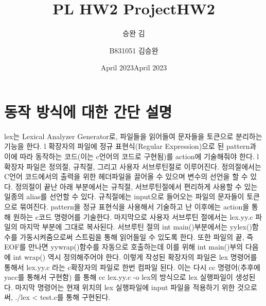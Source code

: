 \documentclass{article}
\title{PL HW2 Project}
\author{승완 김}
\date{April 2023}
\begin{document}
\title{HW2}
\author{B831051 김승완}
\date{April 2023}
\maketitle


\section{동작 방식에 대한 간단 설명}
lex는 Lexical Analyzer Generator로, 파일들을 읽어들여 문자들을 토큰으로 분리하는 기능을 한다. l 확장자의 파일에 정규 표현식(Regular Expression)으로 된 pattern과 이에 따라 동작하는 코드(이는 c언어의 코드로 구현됨)를 action에 기술해줘야 한다. l 확장자 파일은 정의절, 규칙절, 그리고 사용자 서브루틴절로 이루어진다. 정의절에서는 C언어 코드에서의 출력을 위한 헤더파일을 끌어올 수 있으며 변수의 선언을 할 수 있다. 정의절이 끝난 아래 부분에서는 규칙절, 서브루틴절에서 편리하게 사용할 수 있는 일종의 alias를 선언할 수 있다. 규칙절에는 input으로 들어오는 파일의 문자들이 토큰으로 묶여진다. pattern을 정규 표현식을 사용해서 기술하고 난 이후에는 action을 통해 원하는 c코드 명령어를  기술한다. 마지막으로 사용자 서브루틴 절에서는 lex.yy.c 파일의 마지막 부분에 그대로 복사된다. 서브루틴 절의 int main()부분에서는 yylex()함수를 가동시켜줌으로써 스트림을 통해 읽어들일 수 있도록 한다. 또한 파일의 끝, 즉 EOF를 만나면 yywrap()함수를 자동으로 호출하는데 이를 위해 int main()부의 다음에 int wrap() 역시 정의해주어야 한다. 
\newline
이렇게 작성된 확장자의 파일은 lex 명령어를 통해서 lex.yy.c 라는 c확장자의 파일로 한번 컴파일 된다. 이는 다시 cc 명령어(추후에 yacc를 통해서 구현함) 를 통해 cc lex.yy.c -o lex의 방식으로 lex 실행파일이 생성된다. 마지막 명령어는 현재 위치의 lex 실행파일에 input 파일을 적용하기 위한 것으로써, ./lex < test.c를 통해 구현된다. 
\newline\newline\newline\newline\newline\newline\newline\newline
\newline\newline
\end{document}
